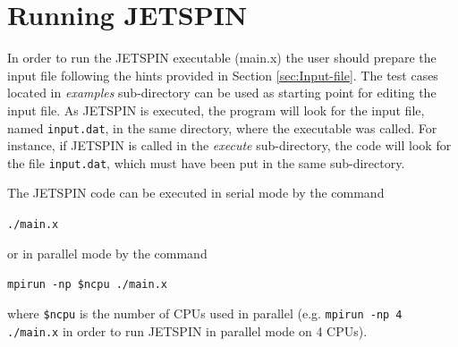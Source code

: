 
\section{Running JETSPIN\label{sec:Running-JETSPIN}}

In order to run the JETSPIN executable (main.x) the user should prepare
the input file following the hints provided in Section \ref{sec:Input-file}.
The test cases located in \textit{examples} sub-directory can be used
as starting point for editing the input file. As JETSPIN is executed,
the program will look for the input file, named \texttt{input.dat},
in the same directory, where the executable was called. For instance,
if JETSPIN is called in the \textit{execute} sub-directory, the code
will look for the file \texttt{input.dat}, which must have been put
in the same sub-directory.

The JETSPIN code can be executed in serial mode by the command\texttt{ }

\bigskip{}

\texttt{./main.x}

\bigskip{}

or in parallel mode by the command

\bigskip{}

\texttt{mpirun -np \$ncpu ./main.x}

\bigskip{}
 where \texttt{\$ncpu} is the number of CPUs used in parallel (e.g.
\texttt{mpirun -np 4 ./main.x} in order to run JETSPIN in parallel
mode on 4 CPUs).

